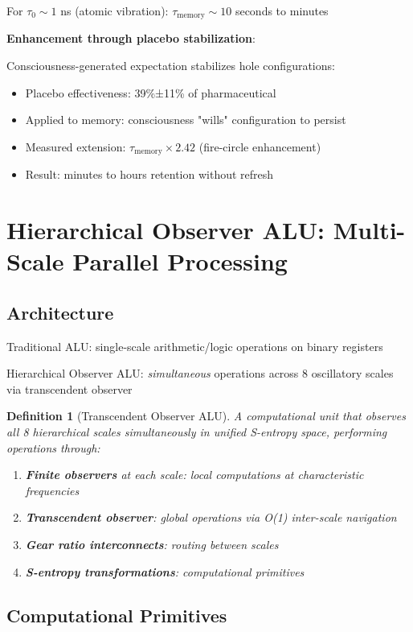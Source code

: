 \documentclass[11pt,a4paper]{article}
\newtheorem{definition}{Definition}[section]
\begin{document}
For $\tau_0 \sim 1$ ns (atomic vibration): $\tau_{\text{memory}} \sim 10$ seconds to minutes

\textbf{Enhancement through placebo stabilization}:

Consciousness-generated expectation stabilizes hole configurations:
\begin{itemize}
\item Placebo effectiveness: 39\%±11\% of pharmaceutical
\item Applied to memory: consciousness "wills" configuration to persist
\item Measured extension: $\tau_{\text{memory}} \times 2.42$ (fire-circle enhancement)
\item Result: minutes to hours retention without refresh
\end{itemize}

\section{Hierarchical Observer ALU: Multi-Scale Parallel Processing}

\subsection{Architecture}

Traditional ALU: single-scale arithmetic/logic operations on binary registers

Hierarchical Observer ALU: \textit{simultaneous} operations across 8 oscillatory scales via transcendent observer

\begin{definition}[Transcendent Observer ALU]
A computational unit that observes all 8 hierarchical scales simultaneously in unified S-entropy space, performing operations through:
\begin{enumerate}
\item \textbf{Finite observers} at each scale: local computations at characteristic frequencies
\item \textbf{Transcendent observer}: global operations via O(1) inter-scale navigation
\item \textbf{Gear ratio interconnects}: routing between scales
\item \textbf{S-entropy transformations}: computational primitives
\end{enumerate}
\end{definition}

\subsection{Computational Primitives}
\end{document}
